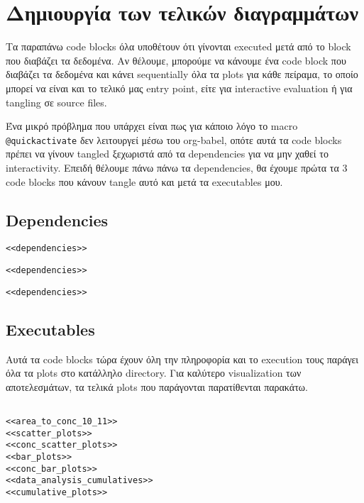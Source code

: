 \documentclass[11pt]{article}
\begin{document}
\section{Δημιουργία των τελικών διαγραμμάτων}
\label{sec:org1d27d6d}
Τα παραπάνω code blocks όλα υποθέτουν ότι γίνονται executed μετά από το block που διαβάζει τα δεδομένα. Αν θέλουμε, μπορούμε να κάνουμε ένα code block που διαβάζει τα δεδομένα και κάνει sequentially όλα τα plots για κάθε πείραμα, το οποίο μπορεί να είναι και το τελικό μας entry point, είτε για interactive evaluation ή για tangling σε source files.

Ένα μικρό πρόβλημα που υπάρχει είναι πως για κάποιο λόγο το macro \texttt{@quickactivate} δεν λειτουργεί μέσω του org-babel, οπότε αυτά τα code blocks πρέπει να γίνουν tangled ξεχωριστά από τα dependencies για να μην χαθεί το interactivity. Επειδή θέλουμε πάνω πάνω τα dependencies, θα έχουμε πρώτα τα 3 code blocks που κάνουν tangle αυτό και μετά τα executables μου.

\subsection{Dependencies}
\label{sec:org4457c2f}
\begin{verbatim}
<<dependencies>>
\end{verbatim}

\begin{verbatim}
<<dependencies>>
\end{verbatim}

\begin{verbatim}
<<dependencies>>
\end{verbatim}

\subsection{Executables}
\label{sec:org111c85a}
Αυτά τα code blocks τώρα έχουν όλη την πληροφορία και το execution τους παράγει όλα τα plots στο κατάλληλο directory. Για καλύτερο visualization των αποτελεσμάτων, τα τελικά plots που παράγονται παρατίθενται παρακάτω.
\begin{verbatim}

<<area_to_conc_10_11>>
<<scatter_plots>>
<<conc_scatter_plots>>
<<bar_plots>>
<<conc_bar_plots>>
<<data_analysis_cumulatives>>
<<cumulative_plots>>

\end{verbatim}
\end{document}
